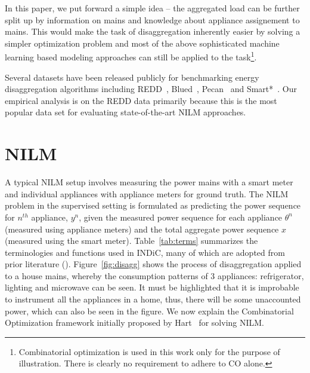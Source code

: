 \documentclass[conference]{IEEEtran}
\newcommand{\figref}[1]{Figure~\ref{#1}}
\newcommand{\tabref}[1]{Table~\ref{#1}}
\newcommand{\indicns}{INDiC}
\begin{document}
\noindent In this paper, we put forward a simple idea -- the aggregated load can be further split up by information on mains and knowledge about appliance assignement to mains. This would make the task of disaggregation inherently easier by solving a simpler optimization problem and most of the above sophisticated machine learning based modeling approaches can still be applied to the task\footnote{Combinatorial optimization is used in this work only for the purpose of illustration. There is clearly no requirement to adhere to CO alone.}. 

\noindent Several datasets have been released publicly for benchmarking energy disaggregation algorithms including REDD~\cite{redd}, Blued~\cite{blued_cmu}, Pecan~\cite{pecan} and Smart*~\cite{smart}. Our empirical analysis is on the REDD data primarily because this is the most popular data set for evaluating state-of-the-art NILM approaches. 

\vspace{-2mm}
\section{NILM}
\vspace{-1mm}
\noindent A typical NILM setup involves measuring the power mains with a smart meter and individual appliances with appliance meters for ground truth. The NILM problem in the supervised setting is formulated as predicting the power sequence for $n^{th}$ appliance, $y^n$, given the measured power sequence for each appliance $\theta^n$ (measured using appliance meters) and the total aggregate power sequence $x$ (measured using the smart meter). \tabref{tab:terms} summarizes the terminologies and functions used in \indicns, many of which are adopted from prior literature (\cite{redd,parson2012_aaai,hart}). \figref{fig:disagg} shows the process of disaggregation applied to a house mains, whereby the consumption patterns of 3 appliances: refrigerator, lighting and microwave can be seen. It must be highlighted that it is improbable to instrument all the appliances in a home, thus, there will be some unaccounted power, which can also be seen in the figure. We now explain the Combinatorial Optimization framework initially proposed by Hart~\cite{hart} for solving NILM.
\end{document}
